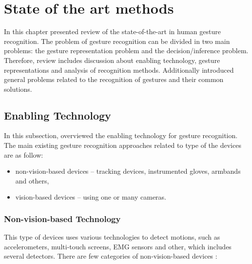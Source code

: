 \section{State of the art methods}
In this chapter presented review of the state-of-the-art in human gesture recognition. The problem of gesture recognition can be divided in two main problems: the gesture representation problem and the decision/inference problem. Therefore, review includes discussion about enabling technology, gesture representations and analysis of recognition methods. Additionally introduced general problems related to the recognition of gestures and their common solutions.

\subsection{Enabling Technology}
In this subsection, overviewed the enabling technology for gesture recognition. The main existing gesture recognition approaches related to type of the devices are as follow:
\begin{itemize}
\item non-vision-based devices -- tracking devices, instrumented gloves, armbands and others,
\item vision-based devices -- using one or many cameras.
\end{itemize}

\subsubsection{Non-vision-based Technology}

This type of devices uses various technologies to detect motions, such as accelerometers, multi-touch screens, EMG sensors and other, which includes several detectors. There are few categories of non-vision-based devices \cite{kaaniche2009human}:


